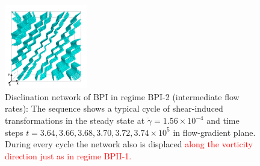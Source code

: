 \documentclass[8.5pt,twoside,twocolumn]{article}
\newcommand{\e}[1]{\times10^{#1}}
\newcommand{\gd}{\dot{\gamma}}
\newcommand{\rev}[1]{{\textcolor{red}{#1}}}
\begin{document}
\begin{figure}[htpb]
\includegraphics[width=0.32\textwidth]{disc-374k_run914r.png}
\caption{Disclination network of BPI in regime BPI-2 (intermediate flow rates): 
The sequence shows a typical cycle of shear-induced transformations in the 
steady state at $\gd=1.56\e{-4}$ and time steps 
$t=3.64, 3.66,3.68,3.70,3.72,3.74\e{5}$ in flow-gradient plane. 
During every cycle the network also is displaced 
\rev{along the vorticity direction just as
in regime BPII-1.
}
}
\label{bp1-2-disc}
\end{figure}
\end{document}
